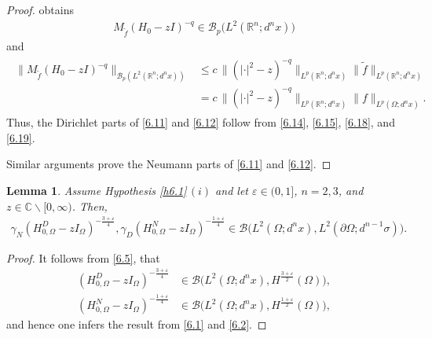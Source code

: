 \documentclass[reqno,10pt, centertags]{amsart}
\newcommand{\bbR}{{\mathbb{R}}}
\newcommand{\bbC}{{\mathbb{C}}}
\newcommand{\cB}{{\mathcal B}}
\newcommand{\abs}[1]{\left\lvert#1\right\rvert}
\newcommand{\lb}{\label}
\newcommand{\f}{\frac}
\newcommand{\ti}{\tilde}
\newcommand{\eps}{\varepsilon}
\newcommand{\ga}{\gamma}
\newcommand{\si}{\sigma}
\newcommand{\Om}{\Omega}
\newcommand{\dOm}{{\partial\Omega}}
\numberwithin{equation}{section}
\newtheorem{lemma}[theorem]{Lemma}
\theoremstyle{definition}
\begin{document}
\begin{proof}
obtains
\begin{align}
M_{\ti f}(H_{0}-zI)^{-q}\in\cB_p\big(L^2(\bbR^n;d^nx)\big) \lb{6.18}
\end{align}
and
\begin{align}\begin{split}
\big\|M_{\ti f}(H_{0}-zI)^{-q}\big\|_{\cB_p(L^2(\bbR^n;d^nx))} &\leq c\,
\|(\abs{\cdot}^2-z)^{-q}\|_{L^p(\bbR^n;d^nx)} \|\ti
f\|_{L^p(\bbR^n;d^nx)} \\&= c\,
\|(\abs{\cdot}^2-z)^{-q}\|_{L^p(\bbR^n;d^nx)}
\|f\|_{L^p(\Om;d^nx)}. \lb{6.19}
\end{split}\end{align}
Thus, the Dirichlet parts of \eqref{6.11} and \eqref{6.12} follow from
\eqref{6.14}, \eqref{6.15}, \eqref{6.18}, and \eqref{6.19}.

Similar arguments prove the Neumann parts of \eqref{6.11} and
\eqref{6.12}.
\end{proof}

\begin{lemma} \lb{l6.3}
Assume Hypothesis \ref{h6.1}\,$(i)$ and let $\eps\in(0,1]$, $n=2,3$, and
$z\in\bbC\backslash[0,\infty)$. Then,
\begin{align}
\ga_N(H_{0,\Om}^D-zI_{\Om})^{-\frac{3+\eps}{4}},
\ga_D(H_{0,\Om}^N-zI_{\Om})^{-\frac{1+\eps}{4}} \in
\cB\big(L^2(\Om;d^nx),L^2(\dOm;d^{n-1}\si)\big).  \lb{6.47a}
\end{align}
\end{lemma}
\begin{proof}
It follows from \eqref{6.5}, that
\begin{align}
(H_{0,\Om}^D-zI_{\Om})^{-\frac{3+\eps}{4}} &\in
\cB\big(L^2(\Om;d^nx),H^{\f{3+\eps}{2}}(\Om)\big),
\\
(H_{0,\Om}^N-zI_{\Om})^{-\frac{1+\eps}{4}} &\in
\cB\big(L^2(\Om;d^nx),H^{\f{1+\eps}{2}}(\Om)\big),
\end{align}
and hence one infers the result from \eqref{6.1} and \eqref{6.2}.
\end{proof}
\end{document}
